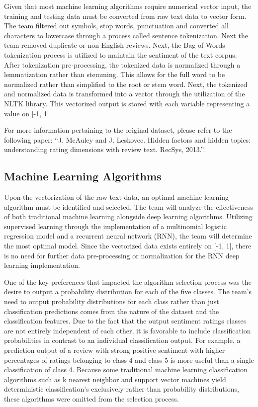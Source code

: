 \documentclass[conference]{IEEEtran}
\begin{document}
Given that most machine learning algorithms require numerical vector input, the training and testing data must be converted from raw text data to vector form. The team filtered out symbols, stop words, punctuation and converted all characters to lowercase through a process called sentence tokenization. Next the team removed duplicate or non English reviews. Next, the Bag of Words tokenization process is utilized to maintain the sentiment of the text corpus. After tokenization pre-processing, the tokenized data is normalized through a lemmatization rather than stemming. This allows for the full word to be normalized rather than simplified to the root or stem word. Next, the tokenized and normalized data is transformed into a vector through the utilization of the NLTK library. This vectorized output is stored with each variable representing a value on [-1, 1]. 

For more information pertaining to the original dataset, please refer to the following paper: “J. McAuley and J. Leskovec. Hidden factors and hidden topics: understanding rating dimensions with review text. RecSys, 2013.”.

\subsection{Machine Learning Algorithms}
Upon the vectorization of the raw text data, an optimal machine learning algorithm must be identified and selected. The team will analyze the effectiveness of both traditional machine learning alongside deep learning algorithms. Utilizing supervised learning through the implementation of a multinomial logistic regression model and a recurrent neural network (RNN), the team will determine the most optimal model. Since the vectorized data exists entirely on [-1, 1], there is no need for further data pre-processing or normalization for the RNN deep learning implementation. 

One of the key preferences that impacted the algorithm selection process was the desire to output a probability distribution for each of the five classes. The team’s need to output probability distributions for each class rather than just classification predictions comes from the nature of the dataset and the classification features. Due to the fact that the output sentiment ratings classes are not entirely independent of each other, it is favorable to include classification probabilities in contrast to an individual classification output. For example, a prediction output of a review with strong positive sentiment with higher percentages of ratings belonging to class 4 and class 5 is more useful than a single classification of class 4. Because some traditional machine learning classification algorithms such as k nearest neighbor and support vector machines yield deterministic classification’s exclusively rather than probability distributions, these algorithms were omitted from the selection process. 
\end{document}
